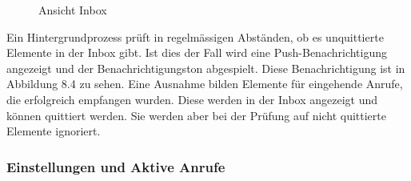 \begin{figure}[h]
\begin{minipage}[b]{0.45\textwidth}
        \caption{Ansicht Inbox}
    \end{minipage}
    \label{fig:MobileClient-Screens2}
\end{figure}

Ein Hintergrundprozess prüft in regelmässigen Abständen, ob es unquittierte Elemente in der Inbox gibt.
Ist dies der Fall wird eine Push-Benachrichtigung angezeigt und der Benachrichtigungston abgespielt.
Diese Benachrichtigung ist in Abbildung 8.4 zu sehen.
Eine Ausnahme bilden Elemente für eingehende Anrufe, die erfolgreich empfangen wurden.
Diese werden in der Inbox angezeigt und können quittiert werden.
Sie werden aber bei der Prüfung auf nicht quittierte Elemente ignoriert.

\clearpage

\subsubsection*{Einstellungen und Aktive Anrufe}

